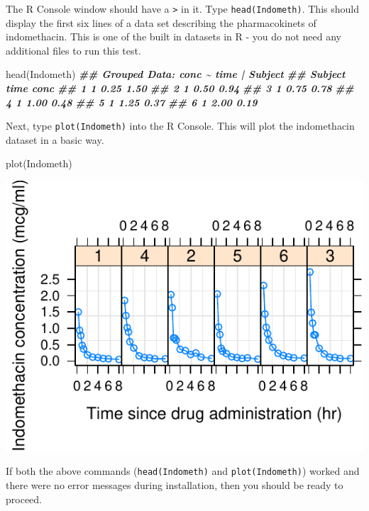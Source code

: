 \documentclass[
]{krantz}
\newenvironment{Shaded}{\begin{snugshade}}{\end{snugshade}}
\newcommand{\DocumentationTok}[1]{\textcolor[rgb]{0.56,0.35,0.01}{\textbf{\textit{#1}}}}
\newcommand{\FunctionTok}[1]{\textcolor[rgb]{0.00,0.00,0.00}{#1}}
\newcommand{\NormalTok}[1]{#1}
\begin{document}
The R Console window should have a \texttt{\textgreater{}} in it. Type \texttt{head(Indometh)}. This should display the first six lines of a data set describing the pharmacokinets of indomethacin. This is one of the built in datasets in R - you do not need any additional files to run this test.

\begin{Shaded}
\begin{Highlighting}[]
\FunctionTok{head}\NormalTok{(Indometh)}
\DocumentationTok{\#\# Grouped Data: conc \textasciitilde{} time | Subject}
\DocumentationTok{\#\#   Subject time conc}
\DocumentationTok{\#\# 1       1 0.25 1.50}
\DocumentationTok{\#\# 2       1 0.50 0.94}
\DocumentationTok{\#\# 3       1 0.75 0.78}
\DocumentationTok{\#\# 4       1 1.00 0.48}
\DocumentationTok{\#\# 5       1 1.25 0.37}
\DocumentationTok{\#\# 6       1 2.00 0.19}
\end{Highlighting}
\end{Shaded}

Next, type \texttt{plot(Indometh)} into the R Console. This will plot the indomethacin dataset in a basic way.

\begin{Shaded}
\begin{Highlighting}[]
\FunctionTok{plot}\NormalTok{(Indometh)}
\end{Highlighting}
\end{Shaded}

\begin{center}\includegraphics[width=0.8\linewidth]{index_files/figure-latex/unnamed-chunk-6-1} \end{center}

If both the above commands (\texttt{head(Indometh)} and \texttt{plot(Indometh)}) worked and there were no error messages during installation, then you should be ready to proceed.
\end{document}
